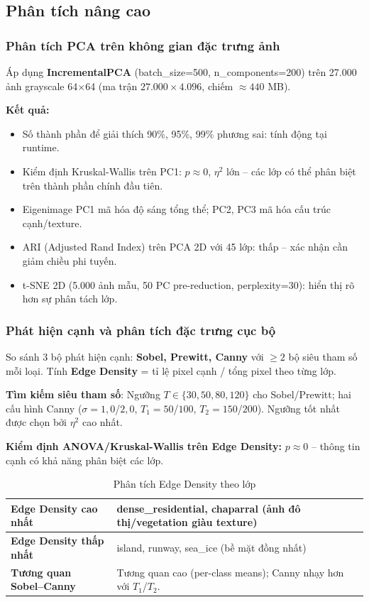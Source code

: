 \documentclass[12pt,a4paper]{article}
\let\oldtextbf\textbf
\renewcommand{\textbf}[1]{\oldtextbf{\textcolor{hcmublue}{#1}}}
\begin{document}
\subsection{Phân tích nâng cao}

\subsubsection{Phân tích PCA trên không gian đặc trưng ảnh}

Áp dụng \textbf{IncrementalPCA} (batch\_size=500, n\_components=200) trên 27.000 ảnh grayscale 64$\times$64 (ma trận $27.000 \times 4.096$, chiếm $\approx 440$ MB).

\textbf{Kết quả:}
\begin{itemize}
    \item Số thành phần để giải thích 90\%, 95\%, 99\% phương sai: tính động tại runtime.
    \item Kiểm định Kruskal-Wallis trên PC1: $p \approx 0$, $\eta^2$ lớn -- các lớp có thể phân biệt trên thành phần chính đầu tiên.
    \item Eigenimage PC1 mã hóa độ sáng tổng thể; PC2, PC3 mã hóa cấu trúc cạnh/texture.
    \item ARI (Adjusted Rand Index) trên PCA 2D với 45 lớp: thấp -- xác nhận cần giảm chiều phi tuyến.
    \item t-SNE 2D (5.000 ảnh mẫu, 50 PC pre-reduction, perplexity=30): hiển thị rõ hơn sự phân tách lớp.
\end{itemize}

\subsubsection{Phát hiện cạnh và phân tích đặc trưng cục bộ}

So sánh 3 bộ phát hiện cạnh: \textbf{Sobel, Prewitt, Canny} với $\geq 2$ bộ siêu tham số mỗi loại. Tính \textbf{Edge Density} = tỉ lệ pixel cạnh / tổng pixel theo từng lớp.

\textbf{Tìm kiếm siêu tham số}: Ngưỡng $T \in \{30, 50, 80, 120\}$ cho Sobel/Prewitt; hai cấu hình Canny ($\sigma = 1{,}0$/$2{,}0$, $T_1 = 50$/$100$, $T_2 = 150$/$200$). Ngưỡng tốt nhất được chọn bởi $\eta^2$ cao nhất.

\textbf{Kiểm định ANOVA/Kruskal-Wallis trên Edge Density:} $p \approx 0$ -- thông tin cạnh có khả năng phân biệt các lớp.

\begin{table}[H]
\centering
\begin{tabular}{|l|l|}
\hline
\textbf{Edge Density cao nhất}  & dense\_residential, chaparral (ảnh đô thị/vegetation giàu texture) \\ \hline
\textbf{Edge Density thấp nhất} & island, runway, sea\_ice (bề mặt đồng nhất) \\ \hline
\textbf{Tương quan Sobel--Canny} & Tương quan cao (per-class means); Canny nhạy hơn với $T_1$/$T_2$. \\ \hline
\end{tabular}
\caption{Phân tích Edge Density theo lớp}
\label{tab:edge_density}
\end{table}
\end{document}
